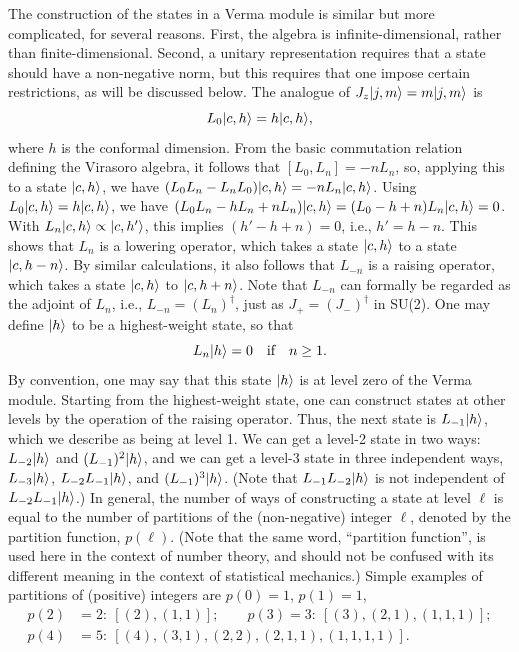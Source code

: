 The construction of the states in a Verma module is similar but more complicated, for several reasons. First, the
algebra is infinite-dimensional, rather than finite-dimensional. Second, a unitary representation requires that a
state should have a non-negative norm, but this requires that one impose certain restrictions, as will be discussed
below. The analogue of $J_z\lvert j,m\rangle = m\lvert j,m\rangle$ is
\begin{equation}
  L_0\lvert c,h\rangle = h\lvert c,h\rangle ,
\end{equation}
where $h$ is the conformal dimension. From the basic commutation relation defining the Virasoro algebra, it follows
that $[L_0,L_n] = -nL_n$, so, applying this to a state $\lvert c,h\rangle$, we have
$(L_0L_n-L_nL_0)\lvert c,h\rangle = -nL_n\lvert c,h\rangle$. Using $L_0\lvert c,h\rangle = h\lvert c,h\rangle$, we have
$(L_0L_n-hL_n+nL_n)\lvert c,h\rangle = (L_0-h+n)L_n\lvert c,h\rangle = 0$. With $L_n\lvert c,h\rangle\propto\lvert c,h'\rangle$, this implies
$(h'-h+n) = 0$, i.e., $h' = h-n$. This shows that $L_n$ is a lowering operator, which takes a state $\lvert c,h\rangle$ to a
state $\lvert c,h-n\rangle$. By similar calculations, it also follows that $L_{-n}$ is a raising operator, which takes a state
$\lvert c,h\rangle$ to $\lvert c,h+n\rangle$. Note that $L_{-n}$ can formally be regarded as the adjoint of $L_n$, i.e.,
$L_{-n} = (L_n)^\dagger$, just as $J_+ = (J_-)^\dagger$ in SU(2). One may define $\lvert h\rangle$ to be a highest-weight
state, so that
\begin{equation}
  L_n\lvert h\rangle = 0 \quad\text{if}\quad n\ge 1 .
\end{equation}
By convention, one may say that this state $\lvert h\rangle$ is at level zero of the Verma module. Starting from the
highest-weight state, one can construct states at other levels by the operation of the raising operator. Thus, the
next state is $L_{-1}\lvert h\rangle$, which we describe as being at level 1. We can get a level-2 state in two ways:
$L_{-2}\lvert h\rangle$ and $(L_{-1})^2\lvert h\rangle$, and we can get a level-3 state in three independent ways, $L_{-3}\lvert h\rangle$,
$L_{-2}L_{-1}\lvert h\rangle$, and $(L_{-1})^3\lvert h\rangle$. (Note that $L_{-1}L_{-2}\lvert h\rangle$ is not independent of
$L_{-2}L_{-1}\lvert h\rangle$.) In general, the number of ways of constructing a state at level $\ell$ is equal to the number
of partitions of the (non-negative) integer $\ell$, denoted by the partition function, $p(\ell)$. (Note that the same
word, ``partition function'', is used here in the context of number theory, and should not be confused with its
different meaning in the context of statistical mechanics.) Simple examples of partitions of (positive) integers are
$p(0) = 1$, $p(1) = 1$,
\begin{align}
  p(2) &= 2:\ [(2),(1,1)]; \qquad p(3) = 3:\ [(3),(2,1),(1,1,1)]; \nonumber\\
  p(4) &= 5:\ [(4),(3,1),(2,2),(2,1,1),(1,1,1,1)] .
\end{align}


